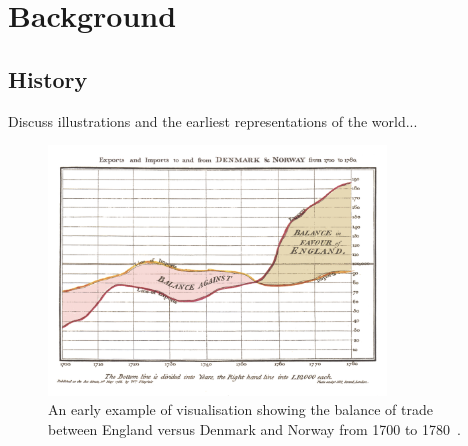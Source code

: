 



\section{Background}

\subsection{History}

Discuss illustrations and the earliest representations of the world...

\begin{figure}
    \centering
    \includegraphics[width=0.8\textwidth]{../images/playfair-graph.png}
    \caption{An early example of visualisation showing the balance of trade between England versus Denmark and Norway from 1700 to 1780~\protect\cite{Playfair1786}.}
    \label{fig:playfair-graph}
\end{figure}

